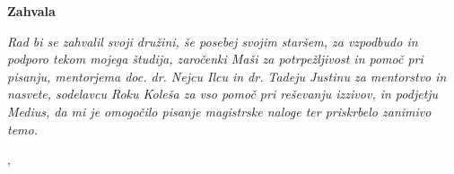 \thispagestyle{empty}

\begin{center}
{\Large \textbf{\sc Zahvala}}
\end{center}
\vspace{0.5cm}

{\it\noindent
Rad bi se zahvalil svoji družini, še posebej svojim staršem, za vzpodbudo in podporo tekom mojega študija, zaročenki Maši za potrpežljivost in pomoč pri pisanju, mentorjema doc. dr. Nejcu Ilcu in dr. Tadeju Justinu za mentorstvo in nasvete, sodelavcu Roku Koleša za vso pomoč pri reševanju izzivov, in podjetju Medius, da mi je omogočilo pisanje magistrske naloge ter priskrbelo zanimivo temo.

\vspace{0.5cm} \hfill \tauthor, \myyear
}